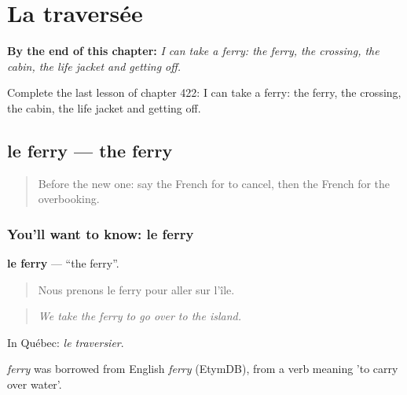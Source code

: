 
\chapter{La traversée}
\label{ch:fr-la-traversee}

\begin{chapteropening}
\textbf{By the end of this chapter:} \emph{I can take a ferry: the ferry, the crossing, the cabin, the life jacket and getting off.}

Complete the last lesson of chapter 422: I can take a ferry: the ferry, the crossing, the cabin, the life jacket and getting off.
\end{chapteropening}

\section[le ferry]{le ferry — the ferry}

\label{lesson:FR-C422-ferry}



\begin{quote}
Before the new one: say the French for to cancel, then the French for the overbooking.
\end{quote}

\subsection*{You'll want to know: le ferry}
\textbf{le ferry} — \textquotedblleft{}the ferry\textquotedblright{}.

\begin{quote}
Nous prenons le ferry pour aller sur l'île.
\end{quote}

\begin{quote}
\emph{We take the ferry to go over to the island.}
\end{quote}

In Québec: \emph{le traversier}.

\begin{cousinweb}
\emph{ferry} was borrowed from English \emph{ferry} (EtymDB), from a verb meaning 'to carry over water'.
\end{cousinweb}

